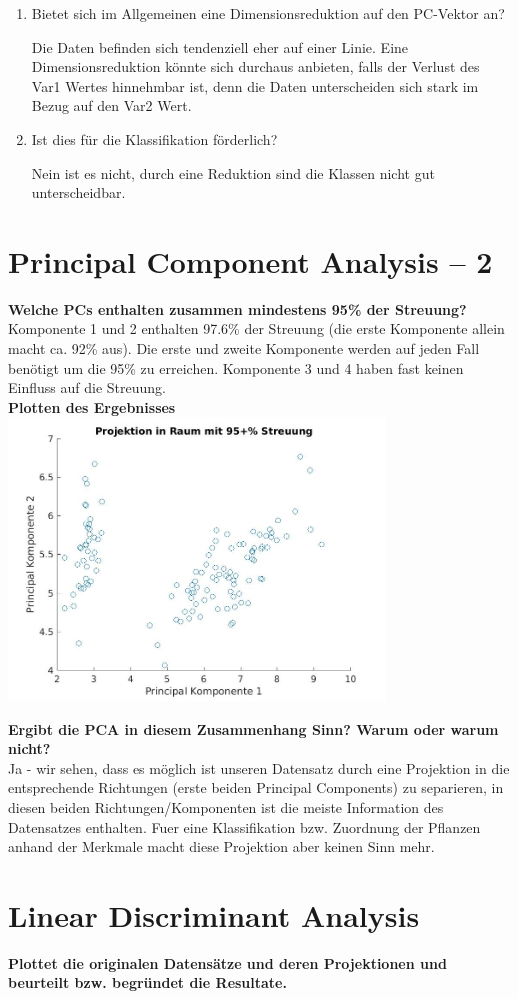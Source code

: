 \documentclass[a4paper]{scrartcl}
\begin{document}
\begin{enumerate}[(a)]
	\begin{enumerate}[1.]
		\item Bietet sich im Allgemeinen eine Dimensionsreduktion auf den PC-Vektor an?
		
		Die Daten befinden sich tendenziell eher auf einer Linie. Eine Dimensionsreduktion könnte sich durchaus anbieten, falls der Verlust des Var1 Wertes hinnehmbar ist, denn die Daten unterscheiden sich stark im Bezug auf den Var2 Wert.
		
		\item Ist dies für die Klassifikation förderlich?
		
		Nein ist es nicht, durch eine Reduktion sind die Klassen nicht gut unterscheidbar.
		
	\end{enumerate}
	
\end{enumerate}


\section{Principal Component Analysis – 2}

\textbf{Welche PCs enthalten zusammen mindestens  95\% der Streuung?}\\
Komponente 1 und 2 enthalten 97.6\% der Streuung (die erste Komponente allein macht  ca. 92\% aus).
Die erste und zweite Komponente werden auf jeden Fall benötigt um die 95\% zu erreichen. 
Komponente 3 und 4 haben fast keinen Einfluss auf die Streuung.\\


\textbf{Plotten des Ergebnisses}\\

\includegraphics[width=0.75\textwidth]{plots/plotresultE.jpg}

\textbf{Ergibt die PCA in diesem Zusammenhang Sinn? Warum oder warum nicht?}\\
Ja - wir sehen, dass es möglich ist unseren Datensatz durch eine Projektion in die entsprechende Richtungen (erste beiden Principal Components) zu separieren, in diesen beiden Richtungen/Komponenten ist die meiste Information des Datensatzes enthalten.
Fuer eine Klassifikation bzw. Zuordnung der Pflanzen anhand der Merkmale macht diese Projektion aber keinen Sinn mehr. 
   
\section{Linear Discriminant Analysis}

\textbf{Plottet die originalen Datensätze und deren Projektionen und beurteilt bzw. begründet die Resultate.}

\end{document}
